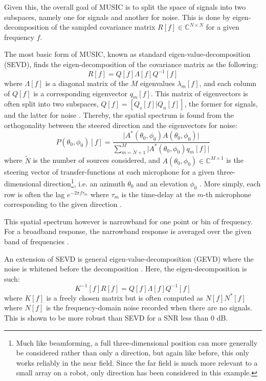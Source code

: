 \documentclass[notitlepage]{report}
\begin{document}
Given this, the overall goal of MUSIC is to split the space of signals into two subspaces, namely one for signals and another for noise. This is done by eigen-decomposition of the sampled covariance matrix $R[f]\in \mathbb{C}^{N\times N}$ for a given frequency $f$.

The most basic form of MUSIC, known as standard eigen-value-decomposition (SEVD), finds the eigen-decomposition of the covariance matrix as the following:
\begin{equation}
R[f] = Q[f]\Lambda[f]Q^{-1}[f]
\end{equation}
where $\Lambda[f]$ is a diagonal matrix of the $M$ eigenvalues $\lambda_m[f]$, and each column of $Q[f]$ is a corresponding eigenvector $q_m[f]$. This matrix of eigenvectors is often split into two subspaces, $Q[f] = [Q_s[f]|Q_n[f]]$, the former for signals, and the latter for noise \cite{rascon_localization_2017}. Thereby, the spatial spectrum is found from the orthogonality between the steered direction and the eigenvectors for noise:
\begin{equation}
P(\theta_0, \phi_0)[f] = \frac{\lvert A^*(\theta_0, \phi_0) A(\theta_0, \phi_0) \rvert}
	{\sum_{m=\tilde{N}+1}^M \lvert A^*(\theta_0, \phi_0) q_m[f] \rvert}
\end{equation}
where $\tilde{N}$ is the number of sources considered, and $A(\theta_0, \phi_0)\in \mathbb{C}^{M\times 1}$ is the steering vector of transfer-functions at each microphone for a given three-dimensional direction\footnote{Much like beamforming, a full three-dimensional position can more generally be considered rather than only a direction, but again like before, this only works reliably in the near field. Since the far field is much more relevant to a small array on a robot, only direction has been considered in this example.}, i.e. an azimuth $\theta_0$ and an elevation $\phi_0$ \cite{nakamura_real-time_2012}. More simply, each row is often the lag $e^{-2\pi f\tau_m}$ where $\tau_m$ is the time-delay at the $m$-th microphone corresponding to the given direction \cite{rascon_localization_2017}.

This spatial spectrum however is narrowband for one point or bin of frequency. For a broadband response, the narrowband response is averaged over the given band of frequencies \cite{ishi_effects_2011} \cite{nakamura_real-time_2012}.

An extension of SEVD is general eigen-value-decomposition (GEVD) where the noise is whitened before the decomposition \cite{nakamura_intelligent_2009} \cite{nakamura_intelligent_2011} \cite{nakamura_real-time_2012}. Here, the eigen-decomposition is such:
\begin{equation}
K^{-1}[f] R[f] = Q[f] \Lambda[f] Q^{-1}[f]
\end{equation}
where $K[f]$ is a freely chosen matrix but is often computed as $N[f]N^*[f]$ where $N[f]$ is the frequency-domain noise recorded when there are no signals. This is shown to be more robust than SEVD for a SNR less than 0 \si{dB}.
\end{document}
